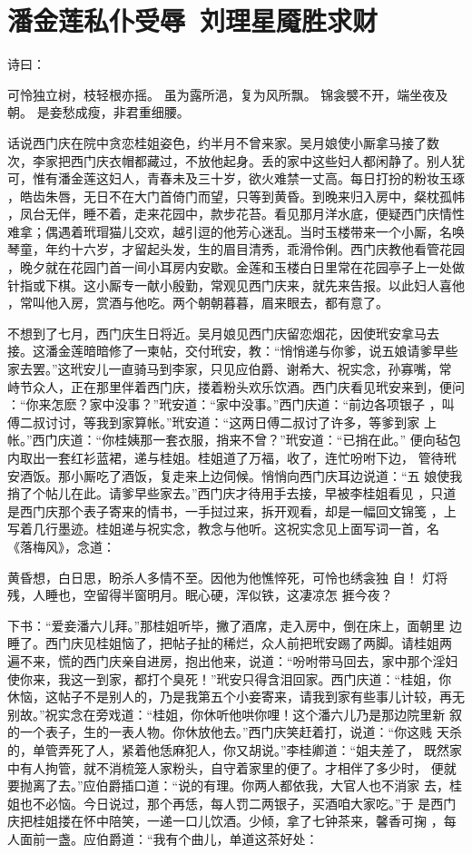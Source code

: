 \chapter{潘金莲私仆受辱~刘理星魇胜求财}

诗曰：

可怜独立树，枝轻根亦摇。
虽为露所浥，复为风所飘。
锦衾襞不开，端坐夜及朝。
是妾愁成瘦，非君重细腰。

话说西门庆在院中贪恋桂姐姿色，约半月不曾来家。吴月娘使小厮拿马接了数
次，李家把西门庆衣帽都藏过，不放他起身。丢的家中这些妇人都闲静了。别人犹
可，惟有潘金莲这妇人，青春未及三十岁，欲火难禁一丈高。每日打扮的粉妆玉琢
，皓齿朱唇，无日不在大门首倚门而望，只等到黄昏。到晚来归入房中，粲枕孤帏
，凤台无伴，睡不着，走来花园中，款步花苔。看见那月洋水底，便疑西门庆情性
难拿；偶遇着玳瑁猫儿交欢，越引逗的他芳心迷乱。当时玉楼带来一个小厮，名唤
琴童，年约十六岁，才留起头发，生的眉目清秀，乖滑伶俐。西门庆教他看管花园
，晚夕就在花园门首一间小耳房内安歇。金莲和玉楼白日里常在花园亭子上一处做
针指或下棋。这小厮专一献小殷勤，常观见西门庆来，就先来告报。以此妇人喜他
，常叫他入房，赏酒与他吃。两个朝朝暮暮，眉来眼去，都有意了。

不想到了七月，西门庆生日将近。吴月娘见西门庆留恋烟花，因使玳安拿马去
接。这潘金莲暗暗修了一柬帖，交付玳安，教：“悄悄递与你爹，说五娘请爹早些
家去罢。”这玳安儿一直骑马到李家，只见应伯爵、谢希大、祝实念，孙寡嘴，常
峙节众人，正在那里伴着西门庆，搂着粉头欢乐饮酒。西门庆看见玳安来到，便问
：“你来怎麽？家中没事？”玳安道：“家中没事。”西门庆道：“前边各项银子
，叫傅二叔讨讨，等我到家算帐。”玳安道：“这两日傅二叔讨了许多，等爹到家
上帐。”西门庆道：“你桂姨那一套衣服，捎来不曾？”玳安道：“已捎在此。”
便向毡包内取出一套红衫蓝裙，递与桂姐。桂姐道了万福，收了，连忙吩咐下边，
管待玳安酒饭。那小厮吃了酒饭，复走来上边伺候。悄悄向西门庆耳边说道：“五
娘使我捎了个帖儿在此。请爹早些家去。”西门庆才待用手去接，早被李桂姐看见
，只道是西门庆那个表子寄来的情书，一手挝过来，拆开观看，却是一幅回文锦笺
，上写着几行墨迹。桂姐递与祝实念，教念与他听。这祝实念见上面写词一首，名
《落梅风》，念道：

黄昏想，白日思，盼杀人多情不至。因他为他憔悴死，可怜也绣衾独
自！  灯将残，人睡也，空留得半窗明月。眠心硬，浑似铁，这凄凉怎
捱今夜？

下书：“爱妾潘六儿拜。”那桂姐听毕，撇了酒席，走入房中，倒在床上，面朝里
边睡了。西门庆见桂姐恼了，把帖子扯的稀烂，众人前把玳安踢了两脚。请桂姐两
遍不来，慌的西门庆亲自进房，抱出他来，说道：“吩咐带马回去，家中那个淫妇
使你来，我这一到家，都打个臭死！”玳安只得含泪回家。西门庆道：“桂姐，你
休恼，这帖子不是别人的，乃是我第五个小妾寄来，请我到家有些事儿计较，再无
别故。”祝实念在旁戏道：“桂姐，你休听他哄你哩！这个潘六儿乃是那边院里新
叙的一个表子，生的一表人物。你休放他去。”西门庆笑赶着打，说道：“你这贱
天杀的，单管弄死了人，紧着他恁麻犯人，你又胡说。”李桂卿道：“姐夫差了，
既然家中有人拘管，就不消梳笼人家粉头，自守着家里的便了。才相伴了多少时，
便就要抛离了去。”应伯爵插口道：“说的有理。你两人都依我，大官人也不消家
去，桂姐也不必恼。今日说过，那个再恁，每人罚二两银子，买酒咱大家吃。”于
是西门庆把桂姐搂在怀中陪笑，一递一口儿饮酒。少倾，拿了七钟茶来，馨香可掬
，每人面前一盏。应伯爵道：“我有个曲儿，单道这茶好处：


